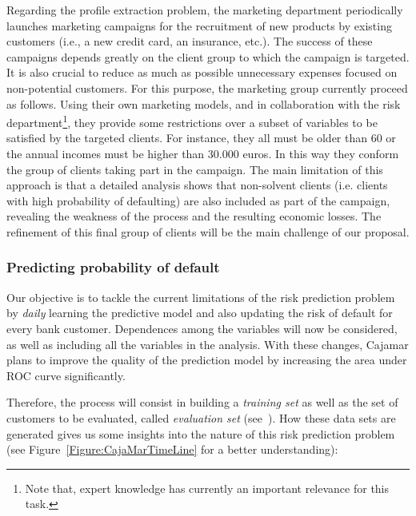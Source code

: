 Regarding the profile extraction problem, the marketing department periodically launches marketing campaigns for the recruitment of new products by existing customers (i.e., a new credit card, an insurance, etc.). The success of these campaigns depends greatly on the client group to which the campaign is targeted. It is also crucial to reduce as much as possible unnecessary expenses focused on non-potential customers.  For this purpose, the marketing group currently proceed as follows. Using their own marketing models, and in collaboration with the risk department\footnote{Note that, expert knowledge has currently an important relevance for this task.}, they provide some restrictions over a subset of variables to be satisfied by the targeted clients. For instance, they all must be older than 60 or the annual incomes must be higher than $30.000$ euros. In this way they conform the group of clients taking part in the campaign. The main limitation of this approach is that a detailed analysis shows that non-solvent clients (i.e. clients with high probability of defaulting) are also included as part of the campaign, revealing the weakness of the process and the resulting economic losses. The refinement of this final group of clients will be the main challenge of our proposal. 


\subsubsection{Predicting probability of default} \label{SubSection:Predicting}

Our objective is to tackle the current limitations of the risk prediction problem by \textit{daily} learning the predictive model and also updating the risk of default for every bank customer. Dependences among the variables will now be considered, as well as including all the variables in the analysis. With these changes, Cajamar plans to improve the quality of the prediction model by increasing the area under ROC curve significantly.


Therefore, the process will consist in building a \textit{training set} as well as the set of customers to be evaluated, called \textit{evaluation set} (see~\cite{Fer14b}). How these data sets are generated gives us some insights into the nature of this risk prediction problem (see Figure~\ref{Figure:CajaMarTimeLine} for a better understanding):


